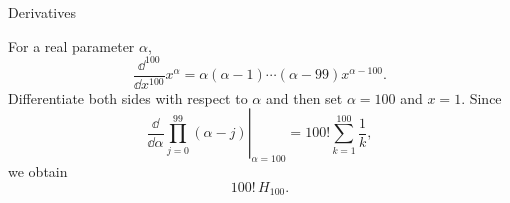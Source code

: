 \begin{expectedproblemgroup}{Derivatives}
        \begin{expectedsubsolution}
            For a real parameter $\alpha$,
            \[
                \frac{\dd^{100}}{\dd x^{100}}x^\alpha
                =
                \alpha(\alpha-1)\cdots(\alpha-99)x^{\alpha-100}.
            \]
            Differentiate both sides with respect to $\alpha$ and then set
            $\alpha=100$ and $x=1$. Since
            \[
                \left.
                \frac{\dd}{\dd\alpha}
                \prod_{j=0}^{99}(\alpha-j)
                \right|_{\alpha=100}
                =
                100!\sum_{k=1}^{100}\frac{1}{k},
            \]
            we obtain
            \[
                \boxed{100!\,H_{100}}.
            \]
        \end{expectedsubsolution}

    \end{expectedproblemgroup}

